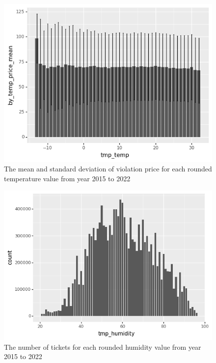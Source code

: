 \documentclass[12pt]{fphw}
\begin{document}
\begin{figure}[h!]
  \label{fig:month_tp}
  \includegraphics[width=1\textwidth]{figures2/Temp_price.png}
  \caption{The mean and standard deviation of violation price for each rounded temperature value from year 2015 to 2022}
\end{figure}

\begin{figure}[h!]
  \label{fig:month_hc}
  \includegraphics[width=1\textwidth]{figures2/Humidity_count.png}
  \caption{The number of tickets for each rounded humidity value from year 2015 to 2022}
\end{figure}
\end{document}
